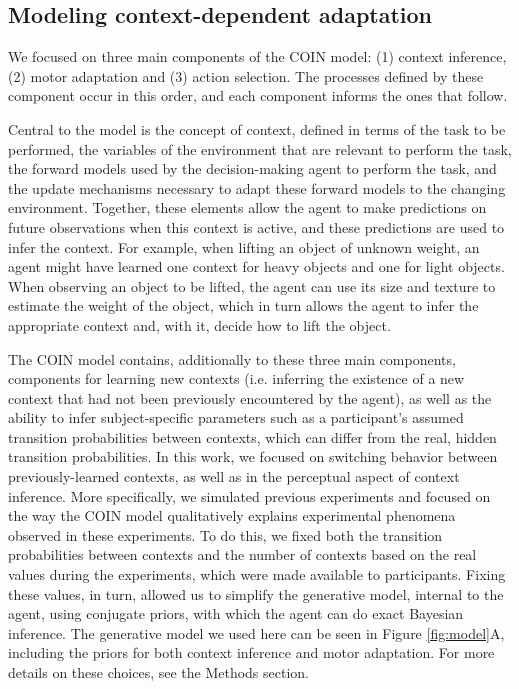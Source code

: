 \documentclass[a4paper,doc,floatsintext,natbib]{apa6}
\def \fref #1{Figure \ref{#1}}     %
\begin{document}
\subsection{Modeling context-dependent adaptation}
We focused on three main components of the COIN model: (1) context inference, (2) motor adaptation and (3) action selection. The processes defined by these component occur in this order, and each component informs the ones that follow.

Central to the model is the concept of context, defined in terms of the task to be performed, the variables of the environment that are relevant to perform the task, the forward models used by the decision-making agent to perform the task, and the update mechanisms necessary to adapt these forward models to the changing environment. Together, these elements allow the agent to make predictions on future observations when this context is active, and these predictions are used to infer the context. For example, when lifting an object of unknown weight, an agent might have learned one context for heavy objects and one for light objects. When observing an object to be lifted, the agent can use its size and texture to estimate the weight of the object, which in turn allows the agent to infer the appropriate context and, with it, decide how to lift the object.

The COIN model contains, additionally to these three main components, components for learning new contexts (i.e. inferring the existence of a new context that had not been previously encountered by the agent), as well as the ability to infer subject-specific parameters such as a participant's assumed transition probabilities between contexts, which can differ from the real, hidden transition probabilities. In this work, we focused on switching behavior between previously-learned contexts, as well as in the perceptual aspect of context inference. More specifically, we simulated previous experiments and focused on the way the COIN model qualitatively explains experimental phenomena observed in these experiments. To do this, we fixed both the transition probabilities between contexts and the number of contexts based on the real values during the experiments, which were made available to participants. Fixing these values, in turn, allowed us to simplify the generative model, internal to the agent, using conjugate priors, with which the agent can do exact Bayesian inference. The generative model we used here can be seen in \fref{fig:model}A, including the priors for both context inference and motor adaptation. For more details on these choices, see the Methods section.
\end{document}
